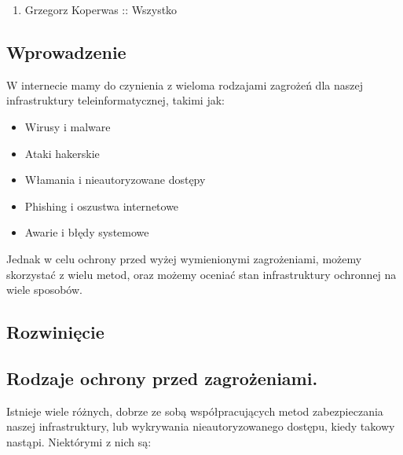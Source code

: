 \documentclass[12pt,a4paper]{article}
\begin{document}
\begin{enumerate}
    \item Grzegorz Koperwas :: Wszystko
\end{enumerate}

\newpage

\subsection{Wprowadzenie}

W internecie mamy do czynienia z wieloma rodzajami zagrożeń dla naszej
infrastruktury teleinformatycznej, takimi jak:

\begin{itemize}
	\item Wirusy i malware
	\item Ataki hakerskie
	\item Włamania i nieautoryzowane dostępy
	\item Phishing i oszustwa internetowe
	\item Awarie i błędy systemowe
\end{itemize}

Jednak w celu ochrony przed wyżej wymienionymi zagrożeniami, możemy skorzystać 
z wielu metod, oraz możemy oceniać stan infrastruktury ochronnej na wiele
sposobów.

\subsection{Rozwinięcie}

\subsection{Rodzaje ochrony przed zagrożeniami.}

Istnieje wiele różnych, dobrze ze sobą współpracujących metod zabezpieczania
naszej infrastruktury, lub wykrywania nieautoryzowanego dostępu, kiedy takowy
nastąpi. Niektórymi z nich są:
\end{document}
